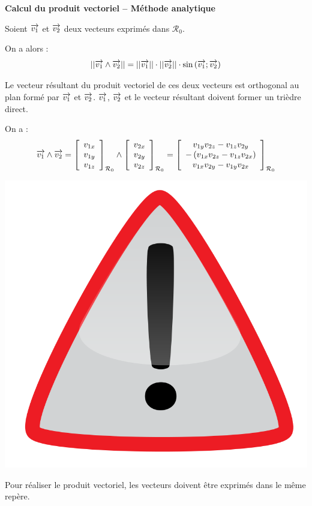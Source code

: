 \documentclass[10pt,oneside]{article}
\begin{document}
\begin{methode}
\textbf{Calcul du produit vectoriel -- Méthode analytique}

Soient $\overrightarrow{v_1}$ et $\overrightarrow{v_2}$ deux vecteurs exprimés dans $\mathcal{R}_0$. 

On a alors :
$$
||\overrightarrow{v_1} \wedge \overrightarrow{v_2}|| = ||\overrightarrow{v_1}|| \cdot ||\overrightarrow{v_2}|| \cdot \sin \left(\overrightarrow{v_1};\overrightarrow{v_2} \right) 
$$

Le vecteur résultant du produit vectoriel de ces deux vecteurs est orthogonal au plan formé par $\overrightarrow{v_1}$ et $\overrightarrow{v_2}$. $\overrightarrow{v_1}$, $\overrightarrow{v_2}$ et le vecteur résultant doivent former un trièdre direct. 

On a :
$$
\overrightarrow{v_1} \wedge \overrightarrow{v_2} 
= 
\left[
\begin{array}{c}
v_{1x}\\
v_{1y}\\
v_{1z}\\
\end{array}
\right]_{\mathcal{R}_0}
\wedge
\left[
\begin{array}{c}
v_{2x}\\
v_{2y}\\
v_{2z}\\
\end{array}
\right]_{\mathcal{R}_0}
=
\left[
\begin{array}{c}
v_{1y}v_{2z}-v_{1z}v_{2y}\\
-\left( v_{1x}v_{2z}-v_{1z}v_{2x}\right)\\
v_{1x}v_{2y}-v_{1y}v_{2x}\\
\end{array}
\right]_{\mathcal{R}_0}
$$


\begin{minipage}[c]{.15\linewidth}
\begin{center}
\includegraphics[width=.8\textwidth]{png/warning3}
\end{center}
\end{minipage} \hfill
\begin{minipage}[c]{.8\linewidth}
Pour réaliser le produit vectoriel, les vecteurs doivent être exprimés dans le même repère.
\end{minipage}
\end{methode}
\end{document}
